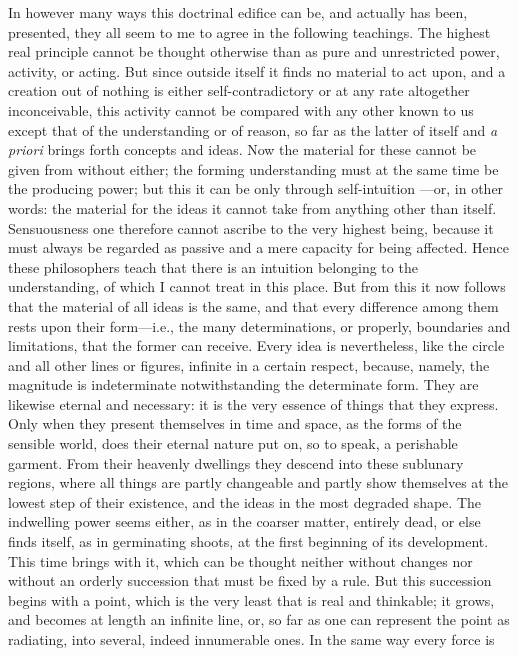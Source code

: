 \documentclass[12pt,a4paper]{article}
\begin{document}
In however many ways this doctrinal edifice can be, and actually has been,
presented, they all seem to me to agree in the following teachings. The highest
real principle cannot be thought otherwise than as pure and unrestricted power,
activity, or acting. But since outside itself it finds no material to act upon,
and a creation out of nothing is either self-contradictory or at any rate
altogether inconceivable, this activity cannot be compared with any other known
to us except that of the understanding or of reason, so far as the latter of
itself and \textit{a priori} brings forth concepts and ideas. Now the material
for these cannot be given from without either; the forming understanding must at
the same time be the producing power; but this it can be only through
self-intuition
---or, in other words: the material for the ideas it cannot take from
anything other than itself. Sensuousness one therefore cannot ascribe to the
very highest being, because it must always be regarded as passive and a mere
capacity for being affected. Hence these philosophers teach that there is an
intuition belonging to the understanding, of which I cannot treat in this place.
But from this it now follows that the material of all ideas is the same, and
that every difference among them rests upon their form---i.e., the many
determinations, or properly, boundaries and limitations, that the former can
receive. Every idea is nevertheless, like the circle and all other lines or
figures, infinite in a certain respect, because, namely, the magnitude is
indeterminate notwithstanding the determinate form. They are likewise eternal
and necessary: it is the very essence of things that they express. Only when
they present themselves in time and space, as the forms of the sensible world,
does their eternal nature put on, so to speak, a perishable garment. From their
heavenly dwellings they descend into these sublunary regions, where all things
are partly changeable and partly show themselves at the lowest step of their
existence, and the ideas in the most degraded shape. The indwelling power seems
either, as in the coarser matter, entirely dead, or else finds itself, as in
germinating shoots, at the first beginning of its development. This time brings
with it, which can be thought neither without changes nor without an orderly
succession that must be fixed by a rule. But this succession begins with a
point, which is the very least that is real and thinkable; it grows, and becomes
at length an infinite line, or, so far as one can represent the point as
radiating, into several, indeed innumerable ones. In the same way every force is
\end{document}
